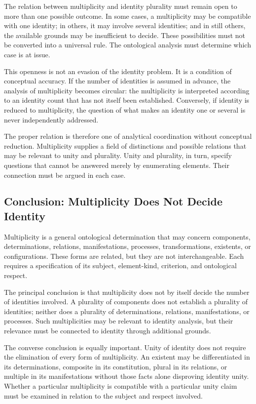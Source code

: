 The relation between multiplicity and
identity plurality must remain open to
more than one possible outcome. In some
cases, a multiplicity may be compatible
with one identity; in others, it may involve
several identities; and in still others,
the available grounds may be insufficient
to decide. These possibilities must not
be converted into a universal rule. The
ontological analysis must determine which
case is at issue.

This openness is not an evasion of the
identity problem. It is a condition of
conceptual accuracy. If the number of
identities is assumed in advance, the
analysis of multiplicity becomes circular:
the multiplicity is interpreted according
to an identity count that has not itself
been established. Conversely, if identity
is reduced to multiplicity, the question
of what makes an identity one or several
is never independently addressed.

The proper relation is therefore one of
analytical coordination without conceptual
reduction. Multiplicity supplies a field
of distinctions and possible relations
that may be relevant to unity and plurality.
Unity and plurality, in turn, specify
questions that cannot be answered merely
by enumerating elements. Their connection
must be argued in each case.

\subsection{Conclusion: Multiplicity Does Not Decide Identity}

Multiplicity is a general ontological
determination that may concern components,
determinations, relations, manifestations,
processes, transformations, existents, or
configurations. These forms are related,
but they are not interchangeable. Each
requires a specification of its subject,
element-kind, criterion, and ontological
respect.

The principal conclusion is that multiplicity
does not by itself decide the number of
identities involved. A plurality of components
does not establish a plurality of identities;
neither does a plurality of determinations,
relations, manifestations, or processes.
Such multiplicities may be relevant to
identity analysis, but their relevance
must be connected to identity through
additional grounds.

The converse conclusion is equally important.
Unity of identity does not require the
elimination of every form of multiplicity.
An existent may be differentiated in its
determinations, composite in its constitution,
plural in its relations, or multiple in
its manifestations without those facts
alone disproving identity unity. Whether
a particular multiplicity is compatible
with a particular unity claim must be
examined in relation to the subject and
respect involved.


